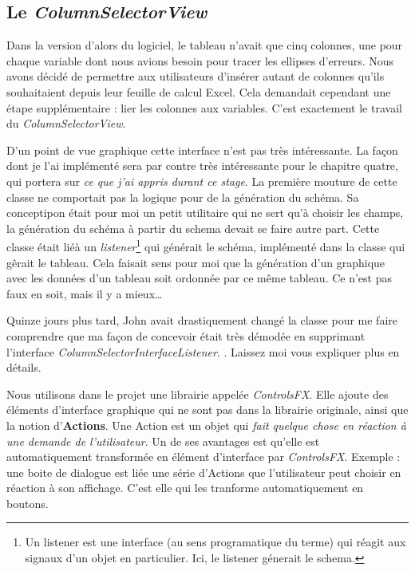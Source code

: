 %
%
\subsection{Le \textit{ColumnSelectorView}}
Dans la version d'alors du logiciel, le tableau n'avait que cinq colonnes, une pour chaque variable dont nous avions besoin pour tracer les ellipses d'erreurs. Nous avons décidé de permettre aux utilisateurs d'insérer autant de colonnes qu'ils souhaitaient depuis leur feuille de calcul Excel. Cela demandait cependant une étape supplémentaire : lier les colonnes aux variables. C'est exactement le travail du \textit{ColumnSelectorView}. 


D'un point de vue graphique cette interface n'est pas très intéressante. La façon dont je l'ai implémenté sera par contre très intéressante pour le chapitre quatre, qui portera sur \textit{ce que j'ai appris durant ce stage}. La première mouture de cette classe ne comportait pas la logique pour de la génération du schéma. Sa conceptipon était pour moi un petit utilitaire qui ne sert qu'à choisir les champs, la génération du schéma à partir du schema devait se faire autre part. Cette classe était liéà un \textit{listener}\footnote{Un listener est une interface (au sens programatique du terme) qui réagit aux signaux d'un objet en particulier. Ici, le listener génerait le schema.} qui générait le schéma, implémenté dans la classe qui gêrait le tableau. Cela faisait sens pour moi que la génération d'un graphique avec les données d'un tableau soit ordonnée par ce même tableau. Ce n'est pas faux en soit, mais il y a mieux\ldots


Quinze jours plus tard, John avait drastiquement changé la classe pour me faire comprendre que ma façon de concevoir était très démodée en supprimant l'interface \textit{ColumnSelectorInterfaceListener}.
. Laissez moi vous expliquer plus en détails.

Nous utilisons dans le projet une librairie appelée \textit{ControlsFX}. Elle ajoute des éléments d'interface graphique qui ne sont pas dans la librairie originale, ainsi que la notion d'\textbf{Actions}. Une Action est un objet qui \textit{fait quelque chose en réaction à une demande de l'utilisateur}. Un de ses avantages est qu'elle est automatiquement transformée en élément d'interface par \textit{ControlsFX}. Exemple : une boite de dialogue est liée une série d'Actions que l'utilisateur peut choisir en réaction à son affichage. C'est elle qui les tranforme automatiquement en boutons.

